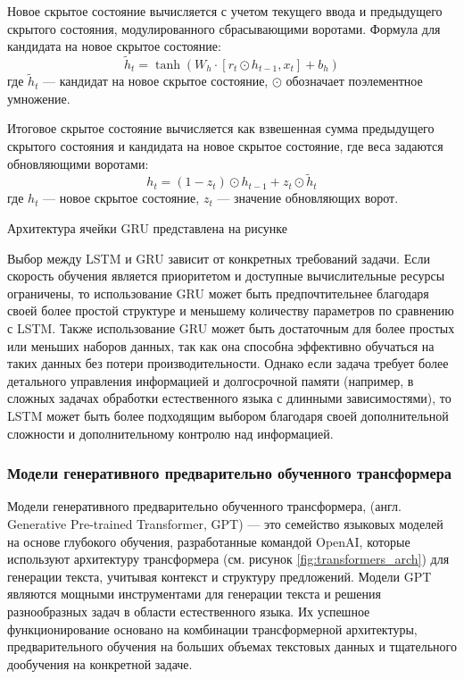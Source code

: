 \documentclass[a4paper,12pt]{extarticle}
\begin{document}
Новое скрытое состояние вычисляется с учетом текущего ввода и предыдущего скрытого состояния, модулированного сбрасывающими воротами. Формула для кандидата на новое скрытое состояние:
\begin{equation}
	\tilde{h}_t = \tanh(W_h \cdot [r_t \odot h_{t-1}, x_t] + b_h)
\end{equation}
где \( \tilde{h}_t \) — кандидат на новое скрытое состояние, \( \odot \) обозначает поэлементное умножение.


Итоговое скрытое состояние вычисляется как взвешенная сумма предыдущего скрытого состояния и кандидата на новое скрытое состояние, где веса задаются обновляющими воротами:
\begin{equation}
	h_t = (1 - z_t) \odot h_{t-1} + z_t \odot \tilde{h}_t
\end{equation}
где \( h_t \) — новое скрытое состояние, \( z_t \) — значение обновляющих ворот.

Архитектура ячейки GRU представлена на рисунке

Выбор между LSTM и GRU зависит от конкретных требований задачи. Если скорость обучения является приоритетом и доступные вычислительные ресурсы ограничены, то использование GRU может быть предпочтительнее благодаря своей более простой структуре и меньшему количеству параметров по сравнению с LSTM. Также использование GRU может быть достаточным для более простых или меньших наборов данных, так как она способна эффективно обучаться на таких данных без потери производительности. Однако если задача требует более детального управления информацией и долгосрочной памяти (например, в сложных задачах обработки естественного языка с длинными зависимостями), то LSTM может быть более подходящим выбором благодаря своей дополнительной сложности и дополнительному контролю над информацией.

\subsubsection{Модели генеративного предварительно обученного трансформера}

Модели генеративного предварительно обученного трансформера, (англ. Generative Pre-trained Transformer, GPT) — это семейство языковых моделей на основе глубокого обучения, разработанные командой OpenAI, которые используют архитектуру трансформера (см. рисунок \ref{fig:transformers_arch}) для генерации текста, учитывая контекст и структуру предложений. Модели GPT являются мощными инструментами для генерации текста и решения разнообразных задач в области естественного языка. Их успешное функционирование основано на комбинации трансформерной архитектуры, предварительного обучения на больших объемах текстовых данных и тщательного дообучения на конкретной задаче.
\end{document}
